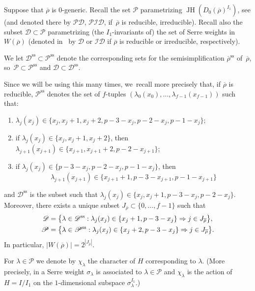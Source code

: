 \documentclass[JEP,XML,SOM,Unicode,NoFloatCountersInSection, NoEqCountersInSection,published]{cedram}
\newcommand{\D}{\mathscr D}
\renewcommand{\P}{\mathscr P}
\renewcommand{\ss}{\mathrm{ss}}
\newcommand{\rhobar}{\overline{\rho}}
\newcommand{\brho}{\overline{\rho}}
\DeclareMathOperator{\JH}{\mathrm{JH}}
\theoremstyle{plain}
\theoremstyle{definition}
\begin{document}
Suppose that $\rhobar$ is $0$-generic. Recall the set $\P$ parametrizing $\JH(D_0(\rhobar)^{I_1})$, see \cite[\S 4]{breuil-buzzati} (and denoted there by $\mathscr{PD}$, \resp $\mathscr{PID}$, if~$\rhobar$ is reducible, \resp irre\-ducible). Recall also the subset $\D \subset \P$ parametrizing (the $I_1$-invariants of) the set of Serre weights in $W(\brho)$ (denoted in \loccit\ by $\D$ or $\mathscr{ID}$ if $\rhobar$ is reducible or irreducible, respectively).

We let $\D^\ss\subset \P^\ss$ denote the corresponding sets for the semisimplification $\rhobar^\ss$ of~$\rhobar$, so~$\P \subset \P^\ss$ and $\D \subset \D^\ss$.

Since we will be using this many times, we~recall more precisely that, if $\brho$ is reducible, $\P^\ss$ denotes the set of $f$-tuples $(\lambda_0(x_0),\dots,\lambda_{f-1}(x_{f-1}))$ such that:
\begin{enumerate}
\item $\lambda_j(x_j) \in \{x_j,x_j+1,x_j+2,p-3-x_j,p-2-x_j,p-1-x_j\}$;
\item if $\lambda_j(x_j) \in \{x_j,x_j+1,x_j+2\}$, then $\lambda_{j+1}(x_{j+1}) \in \{x_{j+1},x_{j+1}+2,p-2-x_{j+1}\}$;
\item if $\lambda_j(x_j) \in \{p-3-x_j,p-2-x_j,p-1-x_j\}$, then
\[
\lambda_{j+1}(x_{j+1}) \in \{x_{j+1}+1,p-3-x_{j+1},p-1-x_{j+1}\}
\]
\end{enumerate}
and $\D^\ss$ is the subset such that $\lambda_j(x_j) \in \{x_j,x_j+1,p-3-x_j,p-2-x_j\}$.
Moreover, there exists a unique subset $J_{\rhobar} \subset \{0,\dots,f-1\}$ such that\vspace*{-3pt}
\begin{align}
\D &= \bigl\{\lambda \in \D^\ss: \lambda_j(x_j) \in \{x_j+1,p-3-x_j\} \Rightarrow j \in J_{\rhobar}\bigr\},\notag \\
\P &= \bigl\{\lambda \in \P^\ss: \lambda_j(x_j) \in \{x_j+2,p-3-x_j\} \Rightarrow j \in J_{\rhobar}\bigr\}.\label{eq:P}
\end{align}
In particular, $|W(\brho)| = 2^{|J_{\brho}|}$.

For $\lambda\in\mathscr{P}$ we denote by $\chi_\lambda$ the character of $H$ corresponding to $\lambda$.
(More precisely, in \cite[\S 4]{breuil-buzzati} a Serre weight $\sigma_\lambda$ is associated to $\lambda \in \P$ and $\chi_\lambda$ is the action of $H=I/I_1$ on the $1$-dimensional subspace $\sigma_\lambda^{I_1}$.)
\end{document}

